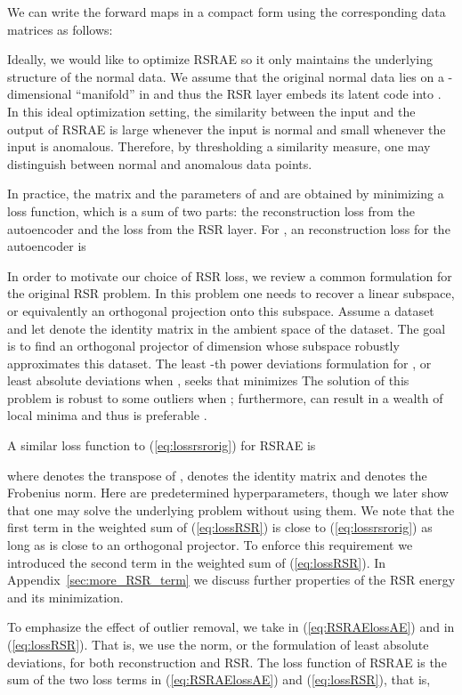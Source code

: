 \documentclass{article} \usepackage{iclr2020_conference,times}
\def\eqref#1{(\ref{#1})}
\begin{document}
We can write the forward maps in a compact form using the corresponding data matrices as follows:


Ideally, we would like to optimize RSRAE so it only maintains the underlying structure of the normal data. We assume that the original normal data lies on a -dimensional ``manifold'' in  and thus the RSR layer embeds its latent code into . In this ideal optimization setting, the similarity between the input and the output of RSRAE is large whenever the input is normal and small whenever the input is anomalous. Therefore, by thresholding a similarity measure,
one may distinguish between normal and anomalous data points.

In practice, the matrix  and the parameters of  and  are  obtained by minimizing a loss function, which is a sum of two parts: the reconstruction loss from the autoencoder and the loss from the RSR layer. For , an  reconstruction loss for the autoencoder is


In order to motivate our choice of RSR loss, we review a common formulation for the original RSR problem. In this problem one needs to recover a linear subspace, or equivalently an orthogonal projection  onto this subspace. Assume a dataset  and let  denote the identity matrix in the ambient space of the dataset. The goal is to find an orthogonal projector  of dimension  whose subspace robustly approximates this dataset. The least -th power deviations formulation for , or least absolute deviations when  \citep{lerman2018overview}, seeks  that minimizes 
The solution of this problem is robust to some outliers when  \citep{lp_recovery_part1_11, lerman2017fast}; furthermore,  can result in a wealth of local minima and thus  is preferable \citep{lp_recovery_part1_11, lerman2017fast}.

A similar loss function to \eqref{eq:lossrsrorig} for RSRAE is

where  denotes the transpose of ,  denotes the  identity matrix and  denotes the Frobenius norm. Here  are predetermined hyperparameters, though we later show that one may solve the underlying problem without using them. We note that the first term in the weighted sum of \eqref{eq:lossRSR} is close to \eqref{eq:lossrsrorig} as long as  is close to an orthogonal projector. To enforce this requirement we introduced the second term in the weighted sum of \eqref{eq:lossRSR}. 
In Appendix~\ref{sec:more_RSR_term} we discuss further properties of the RSR energy and its minimization. 

To emphasize the effect of outlier removal, we take  in \eqref{eq:RSRAElossAE} and  in \eqref{eq:lossRSR}. That is, we use the  norm, or the formulation of least absolute deviations, for both  reconstruction and RSR. The loss function of RSRAE is the sum of
the two loss terms in \eqref{eq:RSRAElossAE} and \eqref{eq:lossRSR}, that is, 
\end{document}
